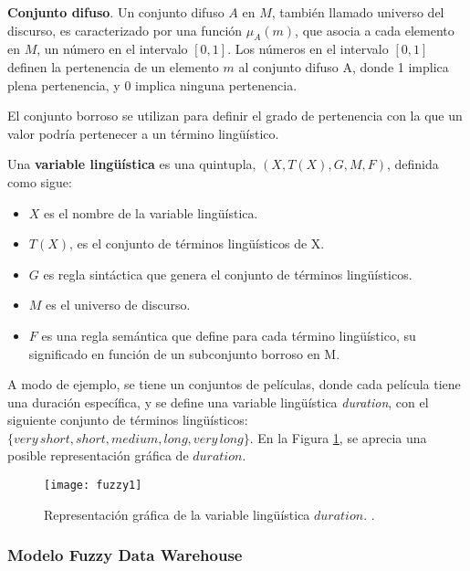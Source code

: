 \documentclass[a4paper,11pt]{article}
\begin{document}
    \textbf{Conjunto difuso}. Un conjunto difuso $A$ en $M$, también llamado universo del discurso, es caracterizado por una función
    $\mu_{A}(m)$, que asocia a cada elemento en $M$, un número en el intervalo $[0,1]$. Los números en el intervalo $[0,1]$ definen la pertenencia
    de un elemento $m$ al conjunto difuso A, donde 1 implica plena pertenencia, y 0 implica ninguna pertenencia.
    
    El conjunto borroso se utilizan para definir el grado de pertenencia con la que un valor podría pertenecer a un término lingüístico.
    
    Una \textbf{variable lingüística} es una quintupla, $(X, T(X), G, M, F)$, definida como sigue:
        
    \begin{itemize}
      \item $X$ es el nombre de la variable lingüística.
      \item $T(X)$, es el conjunto de términos lingüísticos de X.
      \item $G$ es regla sintáctica que genera el conjunto de términos lingüísticos.
      \item $M$ es el universo de discurso.
      \item $F$ es una regla semántica que define para cada término lingüístico, su significado en función de un subconjunto borroso en M.
    \end{itemize}
    
    A modo de ejemplo, se tiene un conjuntos de películas, donde cada película tiene una duración específica, y se define una variable lingüística \textit{duration},
    con el siguiente conjunto de términos lingüísticos: $\{ very\,short, short, medium, long, very\,long \}$.
    En la Figura \ref{ejVarLinguistica}, se aprecia una posible representación gráfica de $duration$.
    
    \begin{figure}
      \begin{center}
        \texttt{[image: fuzzy1]}
        \caption{Representación gráfica de la variable lingüística $duration$. \cite[p.~39]{Fasel14}.}
        \label{ejVarLinguistica}
      \end{center}
    \end{figure}
    
    
    \subsubsection{Modelo Fuzzy Data Warehouse} \label{MFDW}
    
\end{document}
